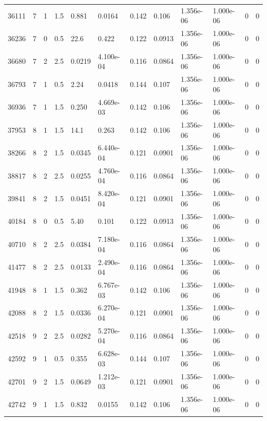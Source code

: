 \documentclass[preview]{standalone}
\begin{document}
{{{\begin{tabular}{L{1.2cm}C{1.2cm} C{0.3cm}C{0.5cm} C{1.4cm}C{1.4cm} C{1.4cm}C{1.4cm} C{1.6cm}C{1.6cm} C{1.6cm}C{1.6cm}}
  36111  &     7  & 1     & 1.5 &  0.881  & 0.0164  &  0.142&   0.106& 1.356e-06 & 1.000e-06   &  0 & 0  \\ 
  36236  &     7  & 0     & 0.5 &  22.6  & 0.422  &  0.122&   0.0913& 1.356e-06 & 1.000e-06   &  0 & 0  \\ 
  36680  &     7  & 2     & 2.5 &  0.0219  & 4.100e-04  &  0.116&   0.0864& 1.356e-06 & 1.000e-06   &  0 & 0  \\ 
  36793  &     7  & 1     & 0.5 &  2.24  & 0.0418  &  0.144&   0.107& 1.356e-06 & 1.000e-06   &  0 & 0  \\ 
  36936  &     7  & 1     & 1.5 &  0.250  & 4.669e-03  &  0.142&   0.106& 1.356e-06 & 1.000e-06   &  0 & 0  \\ 
  37953  &     8  & 1     & 1.5 &  14.1  & 0.263  &  0.142&   0.106& 1.356e-06 & 1.000e-06   &  0 & 0  \\ 
  38266  &     8  & 2     & 1.5 &  0.0345  & 6.440e-04  &  0.121&   0.0901& 1.356e-06 & 1.000e-06   &  0 & 0  \\ 
  38817  &     8  & 2     & 2.5 &  0.0255  & 4.760e-04  &  0.116&   0.0864& 1.356e-06 & 1.000e-06   &  0 & 0  \\ 
  39841  &     8  & 2     & 1.5 &  0.0451  & 8.420e-04  &  0.121&   0.0901& 1.356e-06 & 1.000e-06   &  0 & 0  \\ 
  40184  &     8  & 0     & 0.5 &  5.40  & 0.101  &  0.122&   0.0913& 1.356e-06 & 1.000e-06   &  0 & 0  \\ 
  40710  &     8  & 2     & 2.5 &  0.0384  & 7.180e-04  &  0.116&   0.0864& 1.356e-06 & 1.000e-06   &  0 & 0  \\ 
  41477  &     8  & 2     & 2.5 &  0.0133  & 2.490e-04  &  0.116&   0.0864& 1.356e-06 & 1.000e-06   &  0 & 0  \\ 
  41948  &     8  & 1     & 1.5 &  0.362  & 6.767e-03  &  0.142&   0.106& 1.356e-06 & 1.000e-06   &  0 & 0  \\ 
  42088  &     8  & 2     & 1.5 &  0.0336  & 6.270e-04  &  0.121&   0.0901& 1.356e-06 & 1.000e-06   &  0 & 0  \\ 
  42518  &     9  & 2     & 2.5 &  0.0282  & 5.270e-04  &  0.116&   0.0864& 1.356e-06 & 1.000e-06   &  0 & 0  \\ 
  42592  &     9  & 1     & 0.5 &  0.355  & 6.628e-03  &  0.144&   0.107& 1.356e-06 & 1.000e-06   &  0 & 0  \\ 
  42701  &     9  & 2     & 1.5 &  0.0649  & 1.212e-03  &  0.121&   0.0901& 1.356e-06 & 1.000e-06   &  0 & 0  \\ 
  42742  &     9  & 1     & 1.5 &  0.832  & 0.0155  &  0.142&   0.106& 1.356e-06 & 1.000e-06   &  0 & 0  \\ 

\end{tabular}}}}
\end{document}
